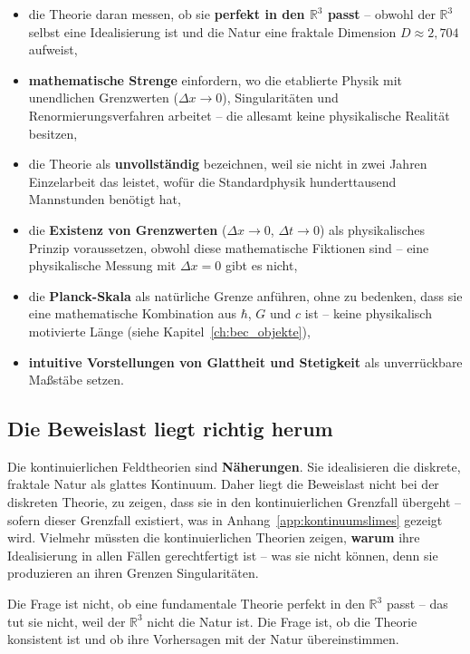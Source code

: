 \begin{itemize}
    \item die Theorie daran messen, ob sie \textbf{perfekt in den $\mathbb{R}^3$ passt} – obwohl der $\mathbb{R}^3$ selbst eine Idealisierung ist und die Natur eine fraktale Dimension $D \approx 2{,}704$ aufweist,
    \item \textbf{mathematische Strenge} einfordern, wo die etablierte Physik mit unendlichen Grenzwerten ($\Delta x \to 0$), Singularitäten und Renormierungsverfahren arbeitet – die allesamt keine physikalische Realität besitzen,
    \item die Theorie als \textbf{unvollständig} bezeichnen, weil sie nicht in zwei Jahren Einzelarbeit das leistet, wofür die Standardphysik hunderttausend Mannstunden benötigt hat,
    \item die \textbf{Existenz von Grenzwerten} ($\Delta x \to 0$, $\Delta t \to 0$) als physikalisches Prinzip voraussetzen, obwohl diese mathematische Fiktionen sind – eine physikalische Messung mit $\Delta x = 0$ gibt es nicht,
    \item die \textbf{Planck-Skala} als natürliche Grenze anführen, ohne zu bedenken, dass sie eine mathematische Kombination aus $\hbar$, $G$ und $c$ ist – keine physikalisch motivierte Länge (siehe Kapitel~\ref{ch:bec_objekte}),
    \item \textbf{intuitive Vorstellungen von Glattheit und Stetigkeit} als unverrückbare Maßstäbe setzen.
\end{itemize}

\subsection{Die Beweislast liegt richtig herum}
\label{sub:beweislast}

Die kontinuierlichen Feldtheorien sind \textbf{Näherungen}. Sie idealisieren die diskrete, fraktale Natur als glattes Kontinuum. Daher liegt die Beweislast nicht bei der diskreten Theorie, zu zeigen, dass sie in den kontinuierlichen Grenzfall übergeht – sofern dieser Grenzfall existiert, was in Anhang~\ref{app:kontinuumslimes} gezeigt wird. Vielmehr müssten die kontinuierlichen Theorien zeigen, \textbf{warum} ihre Idealisierung in allen Fällen gerechtfertigt ist – was sie nicht können, denn sie produzieren an ihren Grenzen Singularitäten.

Die Frage ist nicht, ob eine fundamentale Theorie perfekt in den $\mathbb{R}^3$ passt – das tut sie nicht, weil der $\mathbb{R}^3$ nicht die Natur ist. Die Frage ist, ob die Theorie konsistent ist und ob ihre Vorhersagen mit der Natur übereinstimmen.

